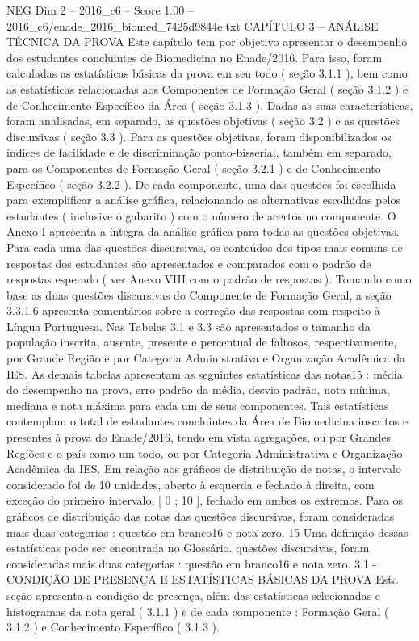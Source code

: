 \begin{textsample}{NEG Dim 2 – 2016\_c6 – Score 1.00 – 2016\_c6/enade\_2016\_biomed\_7425d9844e.txt}  \label{ex:f2_neg_229}
CAPÍTULO 3 – ANÁLISE TÉCNICA DA PROVA Este capítulo tem por objetivo apresentar o desempenho dos estudantes concluintes de Biomedicina no Enade/2016.
Para isso, foram calculadas as estatísticas básicas da prova em seu todo ( seção 3.1.1 ), bem como as estatísticas relacionadas aos Componentes de Formação Geral ( seção 3.1.2 ) e de Conhecimento Específico da Área ( seção 3.1.3 ).
Dadas as suas características, foram analisadas, em separado, as questões objetivas ( seção 3.2 ) e as questões discursivas ( seção 3.3 ).
Para as questões objetivas, foram disponibilizados os índices de facilidade e de discriminação ponto-bisserial, também em separado, para os Componentes de Formação Geral ( seção 3.2.1 ) e de Conhecimento Específico ( seção 3.2.2 ).
De cada componente, uma das questões foi escolhida para exemplificar a análise gráfica, relacionando as alternativas escolhidas pelos estudantes ( inclusive o gabarito ) com o número de acertos no componente.
O Anexo I apresenta a íntegra da análise gráfica para todas as questões objetivas.
Para cada uma das questões discursivas, os conteúdos dos tipos mais comuns de respostas dos estudantes são apresentados e comparados com o padrão de respostas esperado ( ver Anexo VIII com o padrão de respostas ).
Tomando como base as duas questões discursivas do Componente de Formação Geral, a seção 3.3.1.6 apresenta comentários sobre a correção das respostas com respeito à Língua Portuguesa.
Nas Tabelas 3.1 e 3.3 são apresentados o tamanho da população inscrita, ausente, presente e percentual de faltosos, respectivamente, por Grande Região e por Categoria Administrativa e Organização Acadêmica da IES.
As demais tabelas apresentam as seguintes estatísticas das notas15 : média do desempenho na prova, erro padrão da média, desvio padrão, nota mínima, mediana e nota máxima para cada um de seus componentes.
Tais estatísticas contemplam o total de estudantes concluintes da Área de Biomedicina inscritos e presentes à prova do Enade/2016, tendo em vista agregações, ou por Grandes Regiões e o país como um todo, ou por Categoria Administrativa e Organização Acadêmica da IES.
Em relação aos gráficos de distribuição de notas, o intervalo considerado foi de 10 unidades, aberto à esquerda e fechado à direita, com exceção do primeiro intervalo, [ 0 ; 10 ], fechado em ambos os extremos.
Para os gráficos de distribuição das notas das questões discursivas, foram consideradas mais duas categorias : questão em branco16 e nota zero. 15 Uma definição dessas estatísticas pode ser encontrada no Glossário. questões discursivas, foram consideradas mais duas categorias : questão em branco16 e nota zero. 3.1 - CONDIÇÃO DE PRESENÇA E ESTATÍSTICAS BÁSICAS DA PROVA Esta seção apresenta a condição de presença, além das estatísticas selecionadas e histogramas da nota geral ( 3.1.1 ) e de cada componente : Formação Geral ( 3.1.2 ) e Conhecimento Específico ( 3.1.3 ).

\end{textsample}
